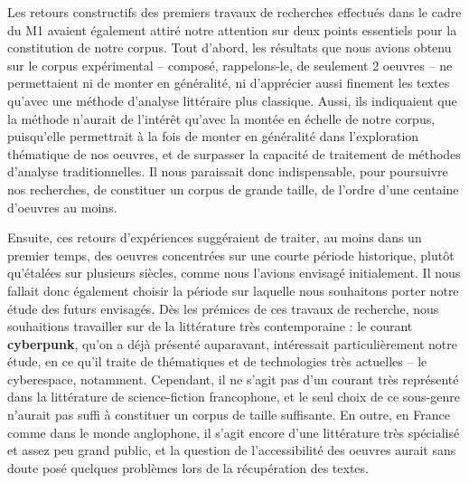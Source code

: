 \documentclass[letterpaper,portrait,12pt]{article}
\begin{document}
	Les retours constructifs des premiers travaux de recherches effectu\'{e}s dans le cadre du M1 avaient \'{e}galement attir\'{e} notre attention sur deux points essentiels pour la constitution de notre corpus. Tout d'abord, les r\'{e}sultats que nous avions obtenu sur le corpus exp\'{e}rimental -- compos\'{e}, rappelons-le, de seulement 2 oeuvres -- ne permettaient ni de monter en g\'{e}n\'{e}ralit\'{e}, ni d'appr\'{e}cier aussi finement les textes qu'avec une m\'{e}thode d'analyse litt\'{e}raire plus classique. Aussi, ils indiquaient que la m\'{e}thode n'aurait de l'int\'{e}r\^{e}t qu'avec la mont\'{e}e en \'{e}chelle de notre corpus, puisqu'elle permettrait \`{a} la fois de monter en g\'{e}n\'{e}ralit\'{e} dans l'exploration th\'{e}matique de nos oeuvres, et de surpasser la capacit\'{e} de traitement de m\'{e}thodes d'analyse traditionnelles. Il nous paraissait donc indispensable, pour poursuivre nos recherches, de constituer un corpus de grande taille, de l'ordre d'une centaine d'oeuvres au moins.





	Ensuite, ces retours d'exp\'{e}riences sugg\'{e}raient de traiter, au moins dans un premier temps, des oeuvres concentr\'{e}es sur une courte p\'{e}riode historique, plut\^{o}t qu'\'{e}tal\'{e}es sur plusieurs si\`{e}cles, comme nous l'avions envisag\'{e} initialement. Il nous fallait donc \'{e}galement choisir la p\'{e}riode sur laquelle nous souhaitons porter notre \'{e}tude des futurs envisag\'{e}s. D\`{e}s les pr\'{e}mices de ces travaux de recherche, nous souhaitions travailler sur de la litt\'{e}rature tr\`{e}s contemporaine : le courant \textbf{cyberpunk}, qu'on a d\'{e}j\`{a} pr\'{e}sent\'{e} auparavant, int\'{e}ressait particuli\`{e}rement notre \'{e}tude, en ce qu'il traite de th\'{e}matiques et de technologies tr\`{e}s actuelles -- le cyberespace, notamment. Cependant, il ne s'agit pas d'un courant tr\`{e}s repr\'{e}sent\'{e} dans la litt\'{e}rature de science-fiction francophone, et le seul choix de ce sous-genre n'aurait pas suffi \`{a} constituer un corpus de taille suffisante. En outre, en France comme dans le monde anglophone, il s'agit encore d'une litt\'{e}rature tr\`{e}s sp\'{e}cialis\'{e} et assez peu grand public, et la question de l'accessibilit\'{e} des oeuvres aurait sans doute pos\'{e} quelques probl\`{e}mes lors de la r\'{e}cup\'{e}ration des textes.
\end{document}

